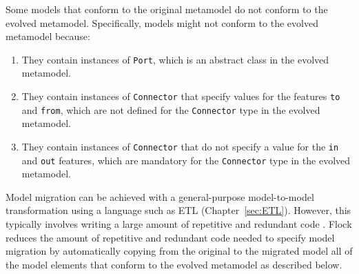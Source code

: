 Some models that conform to the original metamodel do not conform to the evolved metamodel. Specifically, models might not conform to the evolved metamodel because:

\begin{enumerate}
	\item They contain instances of \texttt{Port}, which is an abstract class in the evolved metamodel.
	\item They contain instances of \texttt{Connector} that specify values for the features \texttt{to} and \texttt{from}, which are not defined for the \texttt{Connector} type in the evolved metamodel.
	\item They contain instances of \texttt{Connector} that do not specify a value for the \texttt{in} and \texttt{out} features, which are mandatory for the \texttt{Connector} type in the evolved metamodel.
\end{enumerate}

Model migration can be achieved with a general-purpose model-to-model transformation using a language such as ETL (Chapter~\ref{sec:ETL}). However, this typically involves writing a large amount of repetitive and redundant code \cite{rose12flock}. Flock reduces the amount of repetitive and redundant code needed to specify model migration by automatically copying from the original to the migrated model all of the model elements that conform to the evolved metamodel as described below.


